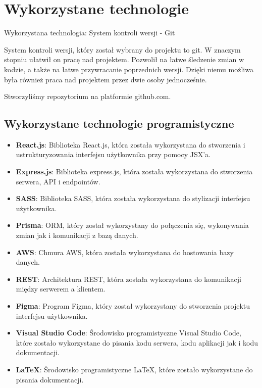 \section{Wykorzystane technologie}

\noindent Wykorzystana technologia: System kontroli wersji - Git

System kontroli wersji, który został wybrany do projektu to git. 
W znaczym stopniu ułatwił on pracę nad projektem. 
Pozwolił na łatwe śledzenie zmian w kodzie, 
a także na łatwe przywracanie poprzednich wersji. 
Dzięki niemu możliwa była również praca nad projektem 
przez dwie osoby jednocześnie. 

Stworzyliśmy repozytorium na platformie github.com.

\subsection{Wykorzystane technologie programistyczne}

\begin{itemize}
    \item \textbf{React.js}: Biblioteka React.js, która została wykorzystana do stworzenia i ustrukturyzowania interfejsu użytkownika przy pomocy JSX'a.
    \item \textbf{Express.js}: Biblioteka express.js, która została wykorzystana do stworzenia serwera, API i endpointów.
    \item \textbf{SASS}: Biblioteka SASS, która została wykorzystana do stylizacji interfejsu użytkownika.
    \item \textbf{Prisma}: ORM, który został wykorzystany do połączenia się, wykonywania zmian jak i komunikacji z bazą danych.
    \item \textbf{AWS}: Chmura AWS, która została wykorzystana do hostowania bazy danych.
    \item \textbf{REST}: Architektura REST, która została wykorzystana do komunikacji między serwerem a klientem. 
    \item \textbf{Figma}: Program Figma, który został wykorzystany do stworzenia projektu interfejsu użytkownika.
    \item \textbf{Visual Studio Code}: Środowisko programistyczne Visual Studio Code, które zostało wykorzystane do pisania kodu serwera, kodu aplikacji jak i kodu dokumentacji.
    \item \textbf{LaTeX}: Środowisko programistyczne LaTeX, które zostało wykorzystane do pisania dokumentacji.
\end{itemize}
